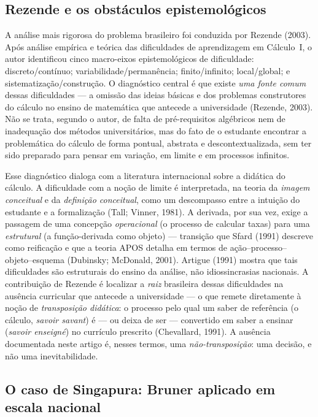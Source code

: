 \documentclass[12pt,a4paper,oneside]{article}
\begin{document}
\subsection{Rezende e os obstáculos epistemológicos}

A análise mais rigorosa do problema brasileiro foi conduzida por Rezende
(2003). Após análise empírica e teórica das dificuldades de aprendizagem
em Cálculo~I, o autor identificou cinco macro-eixos epistemológicos de
dificuldade: discreto/contínuo; variabilidade/permanência;
finito/infinito; local/global; e sistematização/construção. O diagnóstico
central é que existe \emph{uma fonte comum} dessas dificuldades --- a
omissão das ideias básicas e dos problemas construtores do cálculo no
ensino de matemática que antecede a universidade (Rezende, 2003). Não se
trata, segundo o autor, de falta de pré-requisitos algébricos nem de
inadequação dos métodos universitários, mas do fato de o estudante
encontrar a problemática do cálculo de forma pontual, abstrata e
descontextualizada, sem ter sido preparado para pensar em variação, em
limite e em processos infinitos.

Esse diagnóstico dialoga com a literatura internacional sobre a didática
do cálculo. A dificuldade com a noção de limite é interpretada, na teoria
da \emph{imagem conceitual} e da \emph{definição conceitual}, como um
descompasso entre a intuição do estudante e a formalização (Tall; Vinner,
1981). A derivada, por sua vez, exige a passagem de uma concepção
\emph{operacional} (o processo de calcular taxas) para uma
\emph{estrutural} (a função-derivada como objeto) --- transição que Sfard
(1991) descreve como reificação e que a teoria APOS detalha em termos de
ação--processo--objeto--esquema (Dubinsky; McDonald, 2001). Artigue (1991)
mostra que tais dificuldades são estruturais do ensino da análise, não
idiossincrasias nacionais. A contribuição de Rezende é localizar a
\emph{raiz} brasileira dessas dificuldades na ausência curricular que
antecede a universidade --- o que remete diretamente à noção de
\emph{transposição didática}: o processo pelo qual um saber de referência
(o cálculo, \emph{savoir savant}) é --- ou deixa de ser --- convertido em
saber a ensinar (\emph{savoir enseigné}) no currículo prescrito
(Chevallard, 1991). A ausência documentada neste artigo é, nesses termos,
uma \emph{não-transposição}: uma decisão, e não uma inevitabilidade.

\subsection{O caso de Singapura: Bruner aplicado em escala nacional}
\label{sec:singapura}
\end{document}
